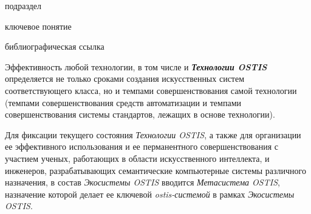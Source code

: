 \begin{SCn}
\begin{scnrelfromlist}{подраздел}
\end{scnrelfromlist}

\bigskip

\begin{scnrelfromlist}{ключевое понятие}
\end{scnrelfromlist}

\bigskip

\begin{scnrelfromlist}{библиографическая ссылка}
\end{scnrelfromlist}
\end{SCn}

Эффективность любой технологии, в том числе и \textbf{\textit{Технологии OSTIS}} определяется не только сроками создания искусственных систем соответствующего класса, но и темпами совершенствования самой технологии (темпами совершенствования средств автоматизации и темпами совершенствования системы стандартов, лежащих в основе технологии).

Для фиксации текущего состояния \textit{Технологии OSTIS}, а также для организации ее эффективного использования и ее перманентного совершенствования с участием ученых, работающих в области искусственного интеллекта, и инженеров, разрабатывающих семантические компьютерные системы различного назначения, в состав \textit{Экосистемы OSTIS} вводится \textit{Метасистема OSTIS}, назначение которой делает ее ключевой \textit{ostis-системой} в рамках \textit{Экосистемы OSTIS}.

\begin{SCn}
\end{SCn}	

